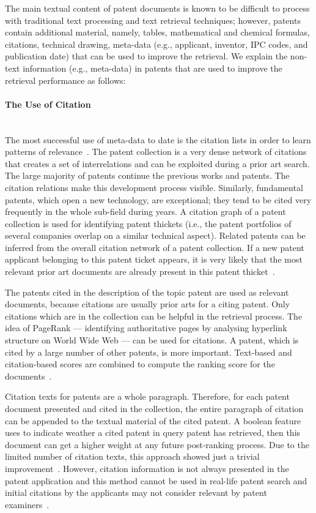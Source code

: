 The main textual content of patent documents is known to be difficult to process with traditional text processing and text retrieval techniques; however, patents contain additional material, namely, tables, mathematical and chemical formulas, citations, technical drawing, meta-data (e.g., applicant, inventor, IPC codes, and publication date) that can be used to improve the retrieval. We explain the non-text information (e.g., meta-data) in patents that are used to improve the retrieval performance as follows:
\paragraph{The Use of Citation}
\ \\
The most successful use of meta-data to date is the citation lists in order to learn patterns of relevance~\citep{lupu2013patent}. The patent collection is a very dense network of citations that creates a set of interrelations and can be exploited during a prior art search. The large majority of patents continue the previous works and patents. The citation relations make this development process
visible. Similarly, fundamental patents, which open a new technology, are exceptional; they tend to be cited very frequently in the whole sub-field during years. A citation graph of a patent collection is used for identifying patent thickets (i.e., the patent portfolios of several companies overlap on a similar technical aspect). Related patents can be inferred from the overall citation network of a patent collection. If a new patent applicant belonging to this patent ticket appears, it is very likely that the most relevant prior art documents are already
present in this patent thicket~\citep{lopez2009multiple}.

The patents cited in the description of the topic patent are used as relevant documents, because citations are usually prior arts for a citing patent. Only citations which are in the collection can be helpful in the retrieval process. The idea of PageRank --- identifying authoritative pages by analysing hyperlink structure on World Wide Web --- can be used for citations. A patent, which is cited by a large number of other patents, is more important. Text-based and citation-based scores are combined to compute the ranking score for the documents~\citep{fujii2007enhancing, fujii2007integrating}.

Citation texts for patents are a whole paragraph. Therefore, for each patent document presented and cited in the collection, the entire paragraph of citation can be appended to the textual material of the cited patent. A boolean feature uses to indicate weather a cited patent in query patent has retrieved, then this document can get a higher weight at any future post-ranking process. Due to the limited number of citation texts, this approach showed just a trivial improvement~\citep{lopez2009multiple}. However, citation information is not always presented in the patent application and this method cannot be used in real-life patent search and initial citations by the applicants may not consider relevant by patent examiners~\citep{magdy2010applying, magdy2011simple}. 

